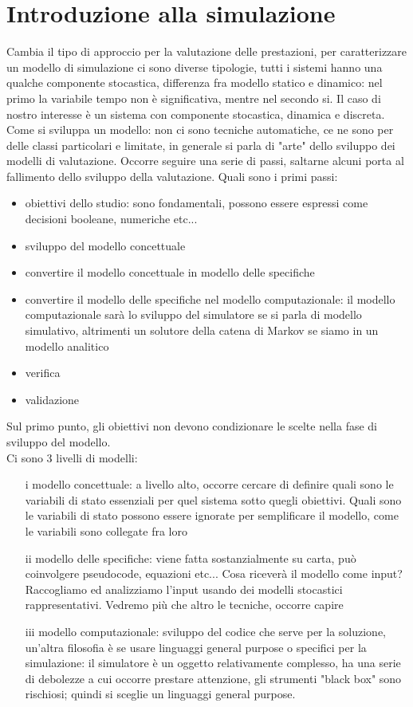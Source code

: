 \documentclass{article}
\begin{document}
\section{Introduzione alla simulazione}
Cambia il tipo di approccio per la valutazione delle prestazioni, per caratterizzare un modello di simulazione ci sono diverse tipologie, tutti i sistemi hanno una qualche componente stocastica, differenza fra modello statico e dinamico: nel primo la variabile tempo non è significativa, mentre nel secondo si. Il caso di nostro interesse è un sistema con componente stocastica, dinamica e discreta. Come si sviluppa un modello: non ci sono tecniche automatiche, ce ne sono per delle classi particolari e limitate, in generale si parla di "arte" dello sviluppo dei modelli di valutazione. Occorre seguire una serie di passi, saltarne alcuni porta al fallimento dello sviluppo della valutazione. Quali sono i primi passi:
\begin{itemize}
\item obiettivi dello studio: sono fondamentali, possono essere espressi come decisioni booleane, numeriche etc...
\item sviluppo del modello concettuale
\item convertire il modello concettuale in modello delle specifiche
\item convertire il modello delle specifiche nel modello computazionale: il modello computazionale sarà lo sviluppo del simulatore se si parla di modello simulativo, altrimenti un solutore della catena di Markov se siamo in un modello analitico
\item verifica
\item validazione
\end{itemize}
Sul primo punto, gli obiettivi non devono condizionare le scelte nella fase di sviluppo del modello.\\ Ci sono 3 livelli di modelli:
\begin{itemize}
\item[i] modello concettuale: a livello alto, occorre cercare di definire quali sono le variabili di stato essenziali per quel sistema sotto quegli obiettivi. Quali sono le variabili di stato possono essere ignorate per semplificare il modello, come le variabili sono collegate fra loro
\item[ii] modello delle specifiche: viene fatta sostanzialmente su carta, può coinvolgere pseudocode, equazioni etc... Cosa riceverà il modello come input? Raccogliamo ed analizziamo l'input usando dei modelli stocastici rappresentativi. Vedremo più che altro le tecniche, occorre capire 
\item[iii] modello computazionale: sviluppo del codice che serve per la soluzione, un'altra filosofia è se usare linguaggi general purpose o specifici per la simulazione: il simulatore è un oggetto relativamente complesso, ha una serie di debolezze a cui occorre prestare attenzione, gli strumenti "black box" sono rischiosi; quindi si sceglie un linguaggi general purpose.
\end{itemize}
\end{document}
